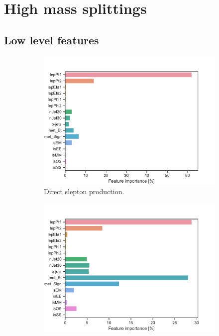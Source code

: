 \section{High mass splittings}
\subsection{Low level features}
\begin{figure}[H]
    \centering
    \begin{subfigure}[t!]{0.49\textwidth}
        \includegraphics[width = \textwidth]{Figures/SlepSlep/ML/BDT/Low_level/High/featureImportance.pdf}
        \caption{Direct slepton production.}
        \label{fig:}
    \end{subfigure}
    \begin{subfigure}[t!]{0.49\textwidth}
        \includegraphics[width = \textwidth]{Figures/SlepSnu/BDT/Low_level/High/featureImportance.pdf}

\end{subfigure}
\end{figure}
